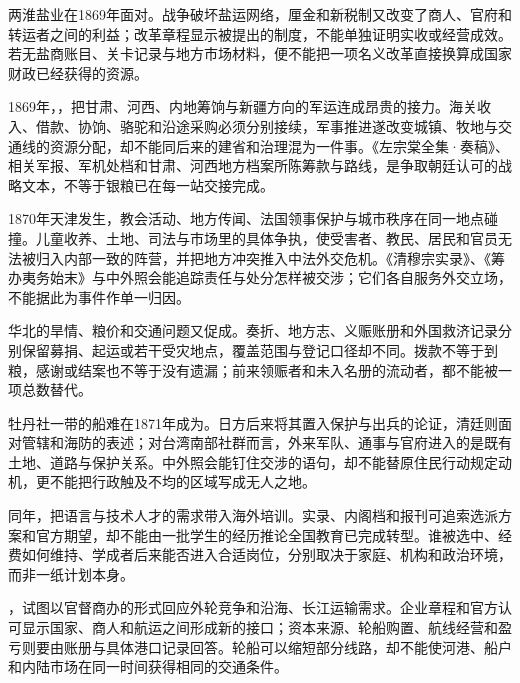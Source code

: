 两淮盐业在1869年面对。战争破坏盐运网络，厘金和新税制又改变了商人、官府和转运者之间的利益；改革章程显示被提出的制度，不能单独证明实收或经营成效。若无盐商账目、关卡记录与地方市场材料，便不能把一项名义改革直接换算成国家财政已经获得的资源。

1869年，，把甘肃、河西、内地筹饷与新疆方向的军运连成昂贵的接力。海关收入、借款、协饷、骆驼和沿途采购必须分别接续，军事推进遂改变城镇、牧地与交通线的资源分配，却不能同后来的建省和治理混为一件事。《左宗棠全集·奏稿》、相关军报、军机处档和甘肃、河西地方档案所陈筹款与路线，是争取朝廷认可的战略文本，不等于银粮已在每一站交接完成。

1870年天津发生，教会活动、地方传闻、法国领事保护与城市秩序在同一地点碰撞。儿童收养、土地、司法与市场里的具体争执，使受害者、教民、居民和官员无法被归入内部一致的阵营，并把地方冲突推入中法外交危机。《清穆宗实录》、《筹办夷务始末》与中外照会能追踪责任与处分怎样被交涉；它们各自服务外交立场，不能据此为事件作单一归因。

华北的旱情、粮价和交通问题又促成。奏折、地方志、义赈账册和外国救济记录分别保留募捐、起运或若干受灾地点，覆盖范围与登记口径却不同。拨款不等于到粮，感谢或结案也不等于没有遗漏；前来领赈者和未入名册的流动者，都不能被一项总数替代。

牡丹社一带的船难在1871年成为。日方后来将其置入保护与出兵的论证，清廷则面对管辖和海防的表述；对台湾南部社群而言，外来军队、通事与官府进入的是既有土地、道路与保护关系。中外照会能钉住交涉的语句，却不能替原住民行动规定动机，更不能把行政触及不均的区域写成无人之地。

同年，把语言与技术人才的需求带入海外培训。实录、内阁档和报刊可追索选派方案和官方期望，却不能由一批学生的经历推论全国教育已完成转型。谁被选中、经费如何维持、学成者后来能否进入合适岗位，分别取决于家庭、机构和政治环境，而非一纸计划本身。

，试图以官督商办的形式回应外轮竞争和沿海、长江运输需求。企业章程和官方认可显示国家、商人和航运之间形成新的接口；资本来源、轮船购置、航线经营和盈亏则要由账册与具体港口记录回答。轮船可以缩短部分线路，却不能使河港、船户和内陆市场在同一时间获得相同的交通条件。

